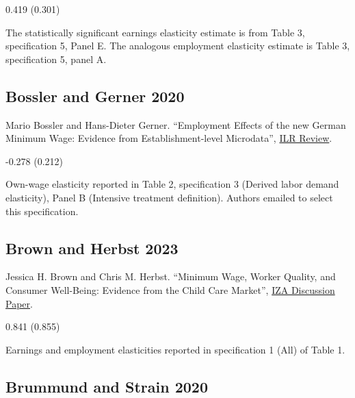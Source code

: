  0.419 (0.301)

\vspace{0.7em}

 The statistically significant earnings elasticity estimate is from Table 3, specification 5, Panel E. The analogous employment elasticity estimate is Table 3, specification 5, panel A.

\subsection*{Bossler and Gerner 2020}
\vspace{-0.7em}

\noindent Mario Bossler and Hans-Dieter Gerner. ``Employment Effects of the new German Minimum Wage: Evidence from Establishment-level Microdata'', \href{https://doi.org/10.1177/0019793919889635}{ILR Review}.

\vspace{0.7em}

 -0.278 (0.212)

\vspace{0.7em}

 Own-wage elasticity reported in Table 2, specification 3 (Derived labor demand elasticity), Panel B (Intensive treatment definition). Authors emailed to select this specification.

\subsection*{Brown and Herbst 2023}
\vspace{-0.7em}

\noindent Jessica H. Brown and Chris M. Herbst. ``Minimum Wage, Worker Quality, and Consumer Well-Being: Evidence from the Child Care Market'', \href{https://docs.iza.org/dp16257.pdf}{IZA Discussion Paper}.

\vspace{0.7em}

 0.841 (0.855)

\vspace{0.7em}

 Earnings and employment elasticities reported in specification 1 (All) of Table 1.

\subsection*{Brummund and Strain 2020}
\vspace{-0.7em}

